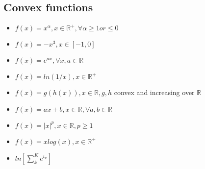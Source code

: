 \subsection{Convex functions}
\begin{itemize}
\item $f(x) = x^{\alpha}, x \in \mathbb{R^+}, \forall \alpha \ge 1 or \le 0$
\item $f(x) = -x^3, x \in [-1,0]$
\item $f(x) = e^{ax}, \forall x,a \in \mathbb{R}$
\item $f(x) = ln(1/x), x \in \mathbb{R^+}$
\item $f(x) = g(h(x)), x \in \mathbb{R}, g,h$ convex and increasing over $\mathbb{R}$
\item $f(x) = ax+b, x \in \mathbb{R}, \forall a,b \in \mathbb{R}$
\item $f(x) = |x|^p, x \in \mathbb{R}, p\ge 1$
\item $f(x) = xlog(x), x \in \mathbb{R}^+$
\item $ln[\sum_k^Ke^{t_k}]$
\end{itemize}

